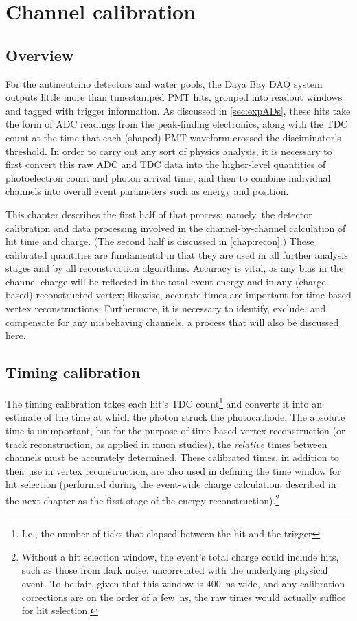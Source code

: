 \documentclass[../thesis.tex]{subfiles}
\begin{document}
\chapter{Channel calibration}
\label{chap:calib}

\section{Overview}

For the antineutrino detectors and water pools, the Daya Bay DAQ system outputs little more than timestamped PMT hits, grouped into readout windows and tagged with trigger information. As discussed in \autoref{sec:expADs}, these hits take the form of ADC readings from the peak-finding electronics, along with the TDC count at the time that each (shaped) PMT waveform crossed the disciminator's threshold. In order to carry out any sort of physics analysis, it is necessary to first convert this raw ADC and TDC data into the higher-level quantities of photoelectron count and photon arrival time, and then to combine individual channels into overall event parameters such as energy and position.

This chapter describes the first half of that process; namely, the detector calibration and data processing involved in the channel-by-channel calculation of hit time and charge. (The second half is discussed in \autoref{chap:recon}.) These calibrated quantities are fundamental in that they are used in all further analysis stages and by all reconstruction algorithms. Accuracy is vital, as any bias in the channel charge will be reflected in the total event energy and in any (charge-based) reconstructed vertex; likewise, accurate times are important for time-based vertex reconstructions. Furthermore, it is necessary to identify, exclude, and compensate for any misbehaving channels, a process that will also be discussed here.

\section{Timing calibration}
\label{sec:calibTiming}

The timing calibration takes each hit's TDC count\footnote{I.e., the number of ticks that elapsed between the hit and the trigger} and converts it into an estimate of the time at which the photon struck the photocathode. The absolute time is unimportant, but for the purpose of time-based vertex reconstruction (or track reconstruction, as applied in muon studies), the \emph{relative} times between channels must be accurately determined. These calibrated times, in addition to their use in vertex reconstruction, are also used in defining the time window for hit selection (performed during the event-wide charge calculation, described in the next chapter as the first stage of the energy reconstruction).\footnote{Without a hit selection window, the event's total charge could include hits, such as those from dark noise, uncorrelated with the underlying physical event. To be fair, given that this window is 400~ns wide, and any calibration corrections are on the order of a few~ns, the raw times would actually suffice for hit selection.}
\end{document}

